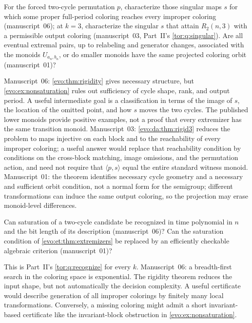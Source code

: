 \documentclass[11pt,a4paper]{article}
\numberwithin{equation}{section}
\theoremstyle{definition}
\theoremstyle{remark}
\begin{document}
\begin{question}\label{evo:q:classify}
For the forced two-cycle permutation $p$, characterize those singular maps $s$
for which some proper full-period coloring reaches every improper coloring
(manuscript~06); at $k=3$, characterize the singular $s$ that attain
$R_2(n,3)$ with a permissible output coloring (manuscript~03, Part~II's
\cref{tor:q:singular}). Are all eventual extremal pairs, up to relabeling and
generator changes, associated with the monoids $U_{a_n,b_n}$, or do smaller
monoids have the same projected coloring orbit (manuscript~01)?
\end{question}
Manuscript~06: \cref{evo:thm:rigidity} gives necessary structure, but
\cref{evo:ex:nonsaturation} rules out sufficiency of cycle shape, rank, and
output period. A useful intermediate goal is a classification in terms of the
image of $s$, the location of the omitted point, and how $s$ moves the two
cycles. The published lower monoids provide positive examples, not a proof
that every extremizer has the same transition monoid. Manuscript~03:
\cref{evo:da:thm:rigid3} reduces the problem to maps injective on each block
and to the reachability of every improper coloring; a useful answer would
replace that reachability condition by conditions on the cross-block
matching, image omissions, and the permutation action, and need not require
that $\langle p,s\rangle$ equal the entire standard witness monoid.
Manuscript~01: the theorem identifies necessary cycle geometry and a
necessary and sufficient orbit condition, not a normal form for the
semigroup; different transformations can induce the same output coloring, so
the projection may erase monoid-level differences.

\begin{question}\label{evo:q:recognize}
Can saturation of a two-cycle candidate be recognized in time polynomial in
$n$ and the bit length of its description (manuscript~06)? Can the saturation
condition of \cref{evo:et:thm:extremizers} be replaced by an efficiently
checkable algebraic criterion (manuscript~01)?
\end{question}
This is Part~II's \cref{tor:q:recognize} for every $k$. Manuscript~06: a
breadth-first search in the coloring space is exponential. The rigidity
theorem reduces the input shape, but not automatically the decision
complexity. A useful certificate would describe generation of all improper
colorings by finitely many local transformations. Conversely, a missing
coloring might admit a short invariant-based certificate like the
invariant-block obstruction in \cref{evo:ex:nonsaturation}.
\end{document}
